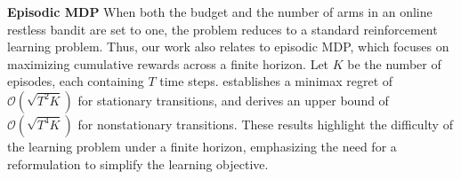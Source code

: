 \textbf{Episodic MDP\;\;} When both the budget and the number of arms in an online restless bandit are set to one, the problem reduces to a standard reinforcement learning problem. Thus, our work also relates to episodic MDP, which focuses on maximizing cumulative rewards across 
a finite horizon. Let $K$ be the number of episodes, each containing $T$ time steps. 
\citet{azar2017minimax} establishes a minimax regret of $\mathcal{O}\left(\sqrt{T^2K}\right)$ for stationary transitions, and \citet{jin2018q} derives an upper bound of $\mathcal{O}\left(\sqrt{T^4K}\right)$ for nonstationary transitions. 
These results highlight the difficulty of the learning problem under a finite horizon, emphasizing the need for a reformulation to simplify the learning objective.
%